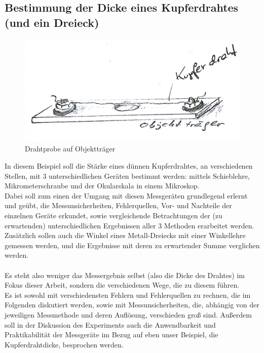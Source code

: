 \documentclass[12pt,a4paper]{article}
\begin{document}
\begin{multicols}{2}
\subsection{Bestimmung der Dicke eines Kupferdrahtes (und ein Dreieck)}
\begin{figure}[H]
	\centering
  	\includegraphics[scale=0.3]{./figure/draht.png}
	\caption{Drahtprobe auf Objektträger}
	\label{fig:201}
\end{figure}
In diesem Beispiel soll die Stärke eines dünnen Kupferdrahtes, an verschiedenen Stellen, mit 3 unterschiedlichen Geräten bestimmt werden: mittels Schieblehre, Mikrometerschraube und der Okularskala in einem Mikroskop.\\
Dabei soll zum einen der Umgang mit diesen Messgeräten grundlegend erlernt und geübt, die Messunsicherheiten, Fehlerquellen, Vor- und Nachteile der einzelnen Geräte erkundet, sowie vergleichende Betrachtungen der (zu erwartenden) unterschiedlichen Ergebnissen aller 3 Methoden erarbeitet werden.\\
Zusätzlich sollen auch die Winkel eines Metall-Dreiecks mit einer Winkellehre gemessen werden, und die Ergebnisse mit deren zu erwartender Summe verglichen werden.\\
\\
Es steht also weniger das Messergebnis selbst (also die Dicke des Drahtes) im Fokus dieser Arbeit, sondern die verschiedenen Wege, die zu diesem führen.\\
Es ist sowohl mit verschiedensten Fehlern und Fehlerquellen zu rechnen, die im Folgenden diskutiert werden, sowie mit Messunsicherheiten, die, abhängig von der jeweiligen Messmethode und deren Auflösung, verschieden groß sind. Außerdem soll in der Diskussion des Experiments auch die Anwendbarkeit und Praktikabilität der Messgeräte im Bezug auf eben unser Beispiel, die Kupferdrahtdicke, besprochen werden.\\
\\


\end{multicols}
\end{document}
